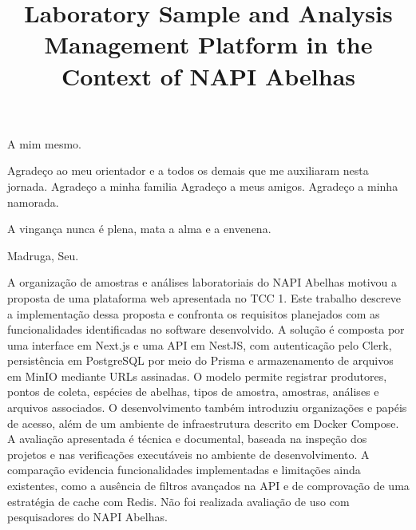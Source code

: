 \documentclass[openright]{normas-utf-tex} %
\title{Laboratory Sample and Analysis Management Platform in the Context of NAPI Abelhas}
\begin{document}
\capa %
\folhaderosto %

\begin{dedicatoria}
A mim mesmo.
\end{dedicatoria}

\begin{agradecimentos}
Agradeço ao meu orientador e a todos os demais que me auxiliaram nesta jornada.
Agradeço a minha familia
Agradeço a meus amigos.
Agradeço a minha namorada.
\end{agradecimentos}

\begin{epigrafe}
A vingança nunca é plena, mata a alma e a envenena.

Madruga, Seu.
\end{epigrafe}

\begin{resumo}
A organização de amostras e análises laboratoriais do NAPI Abelhas motivou a proposta de uma plataforma web apresentada no TCC 1. Este trabalho descreve a implementação dessa proposta e confronta os requisitos planejados com as funcionalidades identificadas no software desenvolvido. A solução é composta por uma interface em Next.js e uma API em NestJS, com autenticação pelo Clerk, persistência em PostgreSQL por meio do Prisma e armazenamento de arquivos em MinIO mediante URLs assinadas. O modelo permite registrar produtores, pontos de coleta, espécies de abelhas, tipos de amostra, amostras, análises e arquivos associados. O desenvolvimento também introduziu organizações e papéis de acesso, além de um ambiente de infraestrutura descrito em Docker Compose. A avaliação apresentada é técnica e documental, baseada na inspeção dos projetos e nas verificações executáveis no ambiente de desenvolvimento. A comparação evidencia funcionalidades implementadas e limitações ainda existentes, como a ausência de filtros avançados na API e de comprovação de uma estratégia de cache com Redis. Não foi realizada avaliação de uso com pesquisadores do NAPI Abelhas.
\end{resumo}
\end{document}

